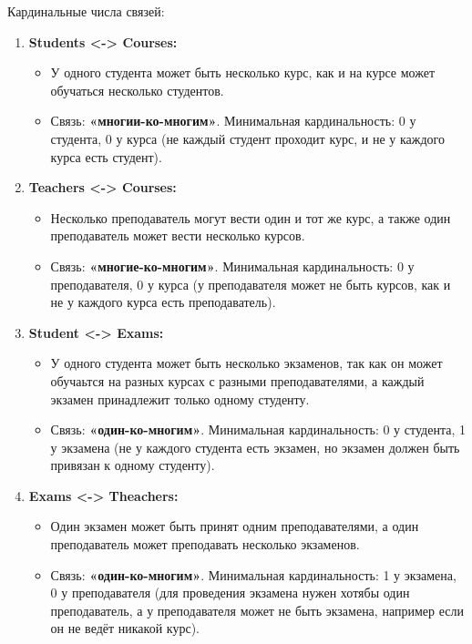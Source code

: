 \documentclass[a4paper, 14pt]{extarticle}
\begin{document}
Кардинальные числа связей:
\begin{enumerate}
    \item \textbf{Students <-> Courses:}
        \begin{itemize}
            \item У одного студента может быть несколько курс, как и на курсе может обучаться несколько студентов.
            \item Связь: \textbf{«многии-ко-многим»}. Минимальная кардинальность: 0 у студента, 0 у курса (не каждый студент проходит курс, и не у каждого курса есть студент).
        \end{itemize}
    
    \item \textbf{Teachers <-> Courses:}
        \begin{itemize}
            \item Несколько преподаватель могут вести один и тот же курс, а также один преподаватель может вести несколько курсов.
            \item Связь: \textbf{«многие-ко-многим»}. Минимальная кардинальность: 0 у преподавателя, 0 у курса (у преподавателя может не быть курсов, как и не у каждого курса есть преподаватель).
        \end{itemize}

    \item \textbf{Student <-> Exams:}
        \begin{itemize}
            \item У одного студента может быть несколько экзаменов, так как он может обучаьтся на разных курсах с разными преподавателями, а каждый экзамен принадлежит только одному студенту. 
            \item Связь: \textbf{«один-ко-многим»}. Минимальная кардинальность: 0 у студента, 1 у экзамена (не у каждого студента есть экзамен, но экзамен должен быть привязан к одному студенту).
        \end{itemize}
    
    \item \textbf{Exams <-> Theachers:}
        \begin{itemize}
            \item Один экзамен может быть принят одним преподавателями, а один преподаватель может преподавать несколько экзаменов.
            \item Связь: \textbf{«один-ко-многим»}. Минимальная кардинальность: 1 у экзамена, 0 у преподавателя (для проведения экзамена нужен хотябы один преподаватель, а у преподавателя может не быть экзамена, например если он не ведёт никакой курс).
        \end{itemize}
    

\end{enumerate}
\end{document}
